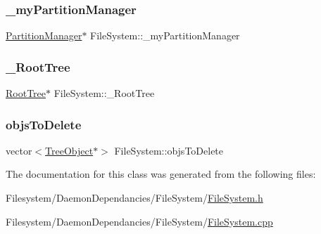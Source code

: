 \mbox{\label{class_file_system_a04deebbe122bcf3b22e3a370c0a7a85c}} 
\subsubsection{\texorpdfstring{\+\_\+my\+Partition\+Manager}{\_myPartitionManager}}
{\footnotesize\ttfamily \mbox{\hyperlink{class_partition_manager}{Partition\+Manager}}$\ast$ File\+System\+::\+\_\+my\+Partition\+Manager\hspace{0.3cm}{\ttfamily [private]}}

\mbox{\label{class_file_system_a3820fe9d31425a9a21a20fafd47fa050}} 
\subsubsection{\texorpdfstring{\+\_\+\+Root\+Tree}{\_RootTree}}
{\footnotesize\ttfamily \mbox{\hyperlink{class_root_tree}{Root\+Tree}}$\ast$ File\+System\+::\+\_\+\+Root\+Tree\hspace{0.3cm}{\ttfamily [private]}}

\mbox{\label{class_file_system_a338e8b9e852fbd0c77086049fc495b77}} 
\subsubsection{\texorpdfstring{objs\+To\+Delete}{objsToDelete}}
{\footnotesize\ttfamily vector$<$\mbox{\hyperlink{class_tree_object}{Tree\+Object}}$\ast$$>$ File\+System\+::objs\+To\+Delete\hspace{0.3cm}{\ttfamily [private]}}



The documentation for this class was generated from the following files\+:\begin{DoxyCompactItemize}
\item 
Filesystem/\+Daemon\+Dependancies/\+File\+System/\mbox{\hyperlink{_file_system_8h}{File\+System.\+h}}\item 
Filesystem/\+Daemon\+Dependancies/\+File\+System/\mbox{\hyperlink{_file_system_8cpp}{File\+System.\+cpp}}\end{DoxyCompactItemize}
